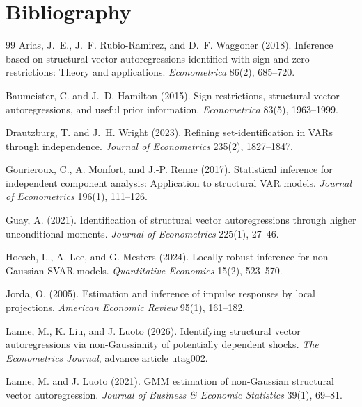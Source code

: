 \documentclass[11pt]{article}
\theoremstyle{definition}
\theoremstyle{plain}
\theoremstyle{remark}
\begin{document}
\section*{Bibliography}
\begin{thebibliography}{99}
Arias, J.~E., J.~F. Rubio-Ramirez, and D.~F. Waggoner (2018).
Inference based on structural vector autoregressions identified with sign and zero restrictions: Theory and applications.
\emph{Econometrica} 86(2), 685--720.

Baumeister, C. and J.~D. Hamilton (2015).
Sign restrictions, structural vector autoregressions, and useful prior information.
\emph{Econometrica} 83(5), 1963--1999.

Drautzburg, T. and J.~H. Wright (2023).
Refining set-identification in VARs through independence.
\emph{Journal of Econometrics} 235(2), 1827--1847.

Gourieroux, C., A. Monfort, and J.-P. Renne (2017).
Statistical inference for independent component analysis: Application to structural VAR models.
\emph{Journal of Econometrics} 196(1), 111--126.

Guay, A. (2021).
Identification of structural vector autoregressions through higher unconditional moments.
\emph{Journal of Econometrics} 225(1), 27--46.

Hoesch, L., A. Lee, and G. Mesters (2024).
Locally robust inference for non-Gaussian SVAR models.
\emph{Quantitative Economics} 15(2), 523--570.

Jorda, O. (2005).
Estimation and inference of impulse responses by local projections.
\emph{American Economic Review} 95(1), 161--182.

Lanne, M., K. Liu, and J. Luoto (2026).
Identifying structural vector autoregressions via non-Gaussianity of potentially dependent shocks.
\emph{The Econometrics Journal}, advance article utag002.

Lanne, M. and J. Luoto (2021).
GMM estimation of non-Gaussian structural vector autoregression.
\emph{Journal of Business \& Economic Statistics} 39(1), 69--81.


\end{thebibliography}
\end{document}
